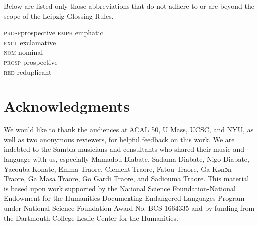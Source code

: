 \documentclass[output=paper]{langscibook}
\begin{document}
Below are listed only those abbreviations that do not adhere to or are beyond the scope of the Leipzig Glossing Rules.

\begin{multicols}{3}
\begin{tabbing}
   \textsc{prosp}\hspace{1em}\= prospective\kill
   \textsc{emph} \> emphatic\\
   \textsc{excl} \> exclamative\\
   \textsc{nom} \> nominal\\
   \textsc{prosp} \> prospective\\
   \textsc{red} \> reduplicant\\
\end{tabbing}
\end{multicols}

\section*{Acknowledgments}

We would like to thank the audiences at ACAL 50, U Mass, UCSC, and NYU, as well as two anonymous reviewers, for helpful feedback on this work. We are indebted to the Sambla musicians and consultants who shared their music and language with us, especially Mamadou Diabate, Sadama Diabate, Nigo Diabate, Yacouba Konate, Emma Traore, Clement Traore, Fatou Traore, Ga Kənɔn Traore, Ga Masa Traore, Go Gardi Traore, and Sadiouma Traore. This material is based upon work supported by the National Science Foundation-National Endowment for the Humanities Documenting Endangered Languages Program under National Science Foundation Award No. BCS-1664335 and by funding from the Dartmouth College Leslie Center for the Humanities. 


{\sloppy\printbibliography[heading=subbibliography,notkeyword=this]}
\end{document}
